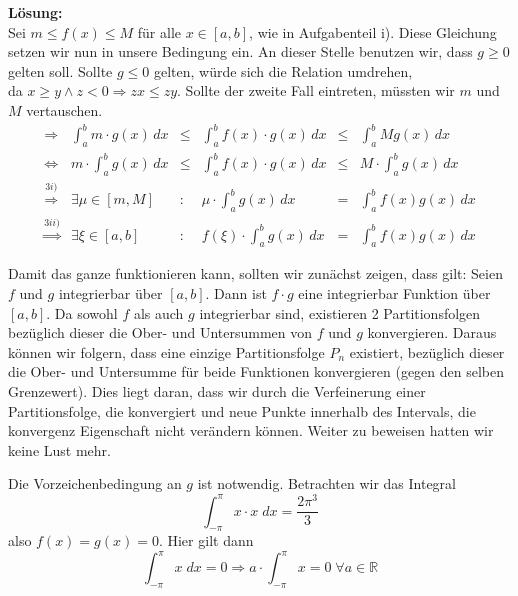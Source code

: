 \documentclass[11pt,a4paper,ngerman]{article}
\begin{document}
\begin{enumerate}[i)]
\textbf{Lösung:}\\
Sei $m \leq f(x) \leq M$ für alle $x \in [a,b]$, wie in Aufgabenteil i). Diese Gleichung setzen wir nun in unsere Bedingung ein. An dieser Stelle benutzen wir, dass $g\geq0$ gelten soll. Sollte $g\leq 0$ gelten, würde sich die Relation umdrehen, \\da $x\geq y \land z<0 \Rightarrow zx \leq zy$. Sollte der zweite Fall eintreten, müssten wir $m$ und $M$ vertauschen.\\
$$
\begin{array}{crcccl}
\Rightarrow& \int_a^b m\cdot g(x) \, dx& \leq & \int_a^b f(x) \cdot g(x) \, dx & \leq & \int_a^b M g(x) \, dx\\
\Leftrightarrow & m \cdot \int_a^b g(x) \, dx & \leq & \int_a^b f(x) \cdot g(x) \, dx & \leq & M \cdot \int_a^b g(x) \, dx\\
\stackrel{3i)}{\Rightarrow} & \exists \mu \in [m,M]&:& \mu \cdot \int_a^b g(x) \, dx & = & \int_a^b f(x)g(x) \, dx \\
\stackrel{3ii)}{\Rightarrow} & \exists \xi \in [a,b] &:& f(\xi) \cdot \int_a^b g(x) \, dx &=& \int_a^b f(x)g(x) \, dx
\end{array}
$$

Damit das ganze funktionieren kann, sollten wir zunächst zeigen, dass gilt:
Seien $f$ und $g$ integrierbar über $[a,b]$.  Dann ist $f\cdot g$ eine integrierbar Funktion über $[a,b]$. Da sowohl $f$ als auch $g$ integrierbar sind, existieren 2 Partitionsfolgen bezüglich dieser die Ober- und Untersummen von $f$ und $g$ konvergieren. Daraus können wir folgern, dass eine einzige Partitionsfolge $P_n$ existiert, bezüglich dieser die Ober- und Untersumme für beide Funktionen konvergieren (gegen den selben Grenzewert). Dies liegt daran, dass wir durch die Verfeinerung einer Partitionsfolge, die konvergiert und neue Punkte innerhalb des Intervals, die konvergenz Eigenschaft nicht verändern können. Weiter zu beweisen hatten wir keine Lust mehr.

Die Vorzeichenbedingung an $g$ ist notwendig. Betrachten wir das Integral
$$
    \int_{-\pi}^{\pi}{x \cdot x \; dx} = \frac{2 \pi^3}{3}
$$
also $f(x) = g(x) = 0$. Hier gilt dann
$$
    \int_{-\pi}^{\pi}{x \; dx} = 0 \Rightarrow a \cdot \int_{-\pi}^{\pi}{x} = 0 \; \forall a \in \mathbb{R}
$$

\end{enumerate}

\pagebreak

\end{document}
